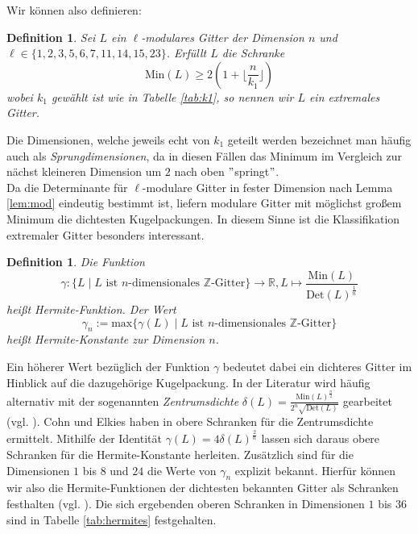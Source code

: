 \documentclass[12pt,a4paper,halfparskip,headsepline,bibtotocnumbered]{scrreprt}
\theoremstyle{nummermitklammern}
\newtheorem{definition}[defsatzusw]{Definition}
\theoremstyle{nonumberbreak}
\newcommand{\Z}{\mathbb{Z}}
\newcommand{\R}{\mathbb{R}}
\newcommand{\Det}{\text{Det}}
\newcommand{\Min}{\text{Min}}
\begin{document}
Wir können also definieren:

\begin{framed}
	\begin{definition}
		Sei $L$ ein $\ell$-modulares Gitter der Dimension $n$ und $\ell \in \lbrace 1,2,3,5,6,7,11,14,15,23 \rbrace$. Erfüllt $L$ die Schranke
		\begin{equation*}
			\Min(L) \geq 2 \left( 1 + \lfloor \frac{n}{k_1} \rfloor \right)
		\end{equation*}
		wobei $k_1$ gewählt ist wie in Tabelle \eqref{tab:k1}, so nennen wir $L$ ein \textit{extremales Gitter}.
	\end{definition}
\end{framed}

Die Dimensionen, welche jeweils echt von $k_1$ geteilt werden bezeichnet man häufig auch als \textit{Sprungdimensionen}, da in diesen Fällen das Minimum im Vergleich zur nächst kleineren Dimension um $2$ nach oben $"$springt$"$.\\
Da die Determinante für $\ell$-modulare Gitter in fester Dimension nach Lemma \eqref{lem:mod} eindeutig bestimmt ist, liefern modulare Gitter mit möglichst großem Minimum die dichtesten Kugelpackungen. In diesem Sinne ist die Klassifikation extremaler Gitter besonders interessant.

\begin{framed}
	\begin{definition}
		Die Funktion
		\begin{equation}
			\gamma : \lbrace L \mid L \text{ ist } n\text{-dimensionales } \Z \text{-Gitter} \rbrace \rightarrow \R, L \mapsto \frac{\Min(L)}{\Det(L)^\frac{1}{n}}
		\end{equation}
		heißt \textit{Hermite-Funktion}. Der Wert
		\begin{equation*}
			\gamma_n := \text{max} \lbrace \gamma(L) \mid L \text{ ist } n \text{-dimensionales } \Z\text{-Gitter} \rbrace
		\end{equation*}
		heißt \textit{Hermite-Konstante} zur Dimension $n$.
	\end{definition}
\end{framed} 

Ein höherer Wert bezüglich der Funktion $\gamma$ bedeutet dabei ein dichteres Gitter im Hinblick auf die dazugehörige Kugelpackung. In der Literatur wird häufig alternativ mit der sogenannten \textit{Zentrumsdichte} $\delta(L) = \frac{\Min(L)^{\frac{n}{2}}}{2^n \sqrt{\Det(L)}}$ gearbeitet (vgl. \cite[(1.5)]{conway}). Cohn und Elkies haben in \cite{cohn} obere Schranken für die Zentrumsdichte ermittelt. Mithilfe der Identität $\gamma(L) = 4 \delta(L)^\frac{2}{n}$ lassen sich daraus obere Schranken für die Hermite-Konstante herleiten. Zusätzlich sind für die Dimensionen $1$ bis $8$ und $24$ die Werte von $\gamma_n$ explizit bekannt. Hierfür können wir also die Hermite-Funktionen der dichtesten bekannten Gitter als Schranken festhalten (vgl. \cite{database}). Die sich ergebenden oberen Schranken in Dimensionen $1$ bis $36$ sind in Tabelle \eqref{tab:hermites} festgehalten.
\end{document}
